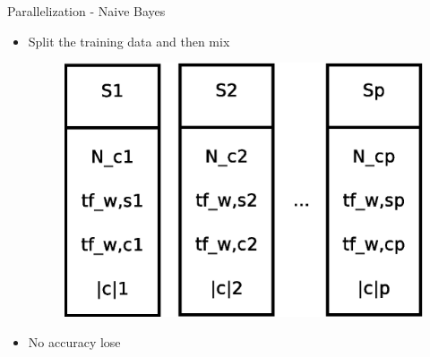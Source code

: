 \documentclass{beamer}
\begin{document}

\begin{frame}{Parallelization - Naive Bayes}

\begin{itemize}

\item Split the training data and then mix

\begin{figure}[!htb]
  \centering
  \includegraphics[scale=0.40]{presentation/naive_bayes_split.eps}
\end{figure}

\item No accuracy lose

\end{itemize}

\end{frame}

\end{document}

